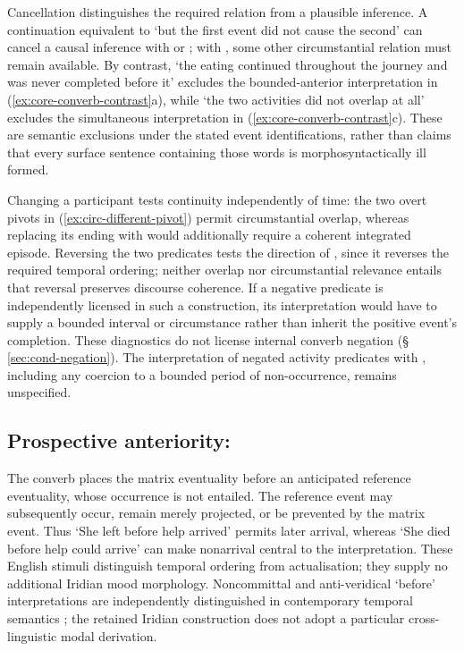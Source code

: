 Cancellation distinguishes the required relation from a plausible inference.
A continuation equivalent to `but the first event did not cause the second'
can cancel a causal inference with  or ; with ,
some other circumstantial relation must remain available. By contrast,
`the eating continued throughout the journey and was never completed before it'
excludes the bounded-anterior interpretation in (\ref{ex:core-converb-contrast}a), while `the two activities
did not overlap at all' excludes the simultaneous interpretation in (\ref{ex:core-converb-contrast}c).
These are semantic exclusions under the stated event identifications, rather
than claims that every surface sentence containing those words is
morphosyntactically ill formed.

Changing a participant tests continuity independently of time: the two overt
pivots in (\ref{ex:circ-different-pivot}) permit circumstantial overlap, whereas
replacing its ending with  would additionally require a coherent
integrated episode. Reversing the two predicates tests the direction of
, since it reverses the required temporal ordering; neither overlap
nor circumstantial relevance entails that reversal preserves discourse
coherence. If a negative predicate is independently licensed in such a
construction, its interpretation would have to supply a bounded interval or
circumstance rather than inherit the positive event's completion. These
diagnostics do not license internal converb negation
(§\,\ref{sec:cond-negation}). The interpretation of negated activity predicates with
, including any coercion to a bounded period of non-occurrence,
remains unspecified.

\subsection{Prospective anteriority: }
\label{sec:prospective-anteriority}

The converb  places the matrix eventuality before an anticipated
reference eventuality, whose occurrence is not entailed. The reference event
may subsequently occur, remain merely projected, or be prevented by the
matrix event. Thus `She left before help arrived' permits later arrival,
whereas `She died before help could arrive' can make nonarrival central to the
interpretation. These English stimuli distinguish temporal ordering from
actualisation; they supply no additional Iridian mood morphology.
Noncommittal and anti-veridical `before' interpretations are independently
distinguished in contemporary temporal semantics
\cite[§1]{ogiharasteinert2024}; the retained Iridian construction does not
adopt a particular cross-linguistic modal derivation.

